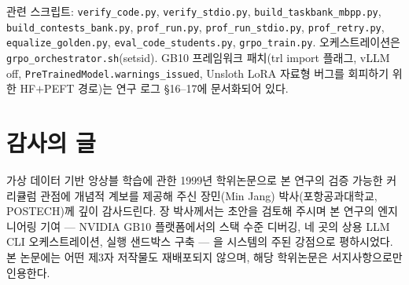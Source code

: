 \documentclass[11pt]{article}
\begin{document}
\medskip\noindent
관련 스크립트: \texttt{verify\_code.py}, \texttt{verify\_stdio.py}, \texttt{build\_taskbank\_mbpp.py}, \texttt{build\_contests\_bank.py}, \texttt{prof\_run.py}, \texttt{prof\_run\_stdio.py}, \texttt{prof\_retry.py}, \texttt{equalize\_golden.py}, \texttt{eval\_code\_students.py}, \texttt{grpo\_train.py}. 오케스트레이션은 \texttt{grpo\_orchestrator.sh}(setsid). GB10 프레임워크 패치(trl import 플래그, vLLM off, \texttt{PreTrainedModel.warnings\_issued}, Unsloth LoRA 자료형 버그를 회피하기 위한 HF$+$PEFT 경로)는 연구 로그 \S16--17에 문서화되어 있다.

\section*{감사의 글}
가상 데이터 기반 앙상블 학습에 관한 1999년 학위논문\citep{jang1999ola}으로 본 연구의 검증 가능한 커리큘럼 관점에 개념적 계보를 제공해 주신 장민(Min Jang) 박사(포항공과대학교, POSTECH)께 깊이 감사드린다. 장 박사께서는 초안을 검토해 주시며 본 연구의 엔지니어링 기여 --- NVIDIA GB10 플랫폼에서의 스택 수준 디버깅, 네 곳의 상용 LLM CLI 오케스트레이션, 실행 샌드박스 구축 --- 을 시스템의 주된 강점으로 평하시었다. 본 논문에는 어떤 제3자 저작물도 재배포되지 않으며, 해당 학위논문은 서지사항으로만 인용한다.



\end{document}

